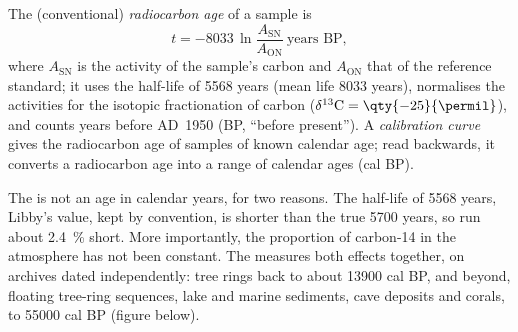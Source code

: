 \begin{definition}\label{def:b1:radiometric-methods:radiocarbon}
The (conventional) \emph{radiocarbon age} of a sample is
\[
  t = -8033 \,\ln \frac{A_{\mathrm{SN}}}{A_{\mathrm{ON}}} \ \text{years BP},
\]
where $A_{\mathrm{SN}}$ is the activity of the sample's carbon and
$A_{\mathrm{ON}}$ that of the reference standard; it uses the half-life of
\num{5568} years (mean life \num{8033} years), normalises the activities for
the isotopic fractionation of carbon ($\delta^{13}\mathrm{C} = \qty{-25}{\permil}$),
and counts years before AD~1950 (BP, ``before present''). A
\emph{calibration curve} gives the radiocarbon age of
samples of known calendar age; read backwards, it converts a radiocarbon age into
a range of calendar ages (cal BP).
\end{definition}

The  is not an age in calendar years, for two reasons. The
half-life of \num{5568} years, Libby's value, kept by convention, is shorter than the true \num{5700} years, so  run about
\qty{2.4}{\percent} short. More importantly, the proportion of carbon-14 in the
atmosphere has not been constant. The  measures both effects
together, on archives dated independently: tree rings back to about
\num{13900} cal BP, and beyond, floating tree-ring sequences, lake and
marine sediments, cave deposits and corals, to \num{55000} cal BP (figure below).

